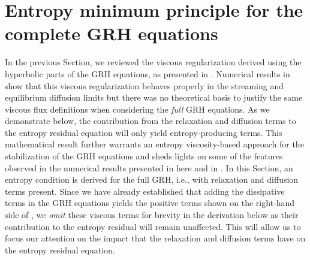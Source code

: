 \documentclass[times,doublespace]{fldauth}%
\begin{document}
\section{Entropy minimum principle for the complete GRH equations}
\label{sec:VR_new}
%
In the previous Section, we  reviewed the viscous regularization derived using the hyperbolic parts of the GRH equations, as presented in \cite{our_jcp_radhy_paper}. 
Numerical results in \cite{our_jcp_radhy_paper} show that this viscous regularization 
behaves properly in the streaming and equilibrium diffusion limits but there was no theoretical basis to justify the same viscous flux definitions when considering the \emph{full} GRH equations. As we 
demonstrate below, the contribution from the relaxation and diffusion terms to the entropy residual equation will only 
yield entropy-producing terms.
This mathematical result further warrants an entropy viscosity-based approach for the stabilization of the GRH equations 
and sheds lights on some of the features observed in the numerical results presented in  here and in \cite{our_jcp_radhy_paper}.
%
%
In this Section, an entropy condition is derived for the full GRH, i.e., with relaxation and diffusion terms present.
Since we have already established that adding the dissipative terms in the GRH equations yields the positive terms shown on the right-hand side of 
, we \emph{omit} these viscous terms for brevity in the derivation below as their contribution to the entropy residual 
will remain unaffected. This will allow us to focus our attention on the impact that the relaxation and diffusion terms have on the entropy residual equation.
\end{document}
